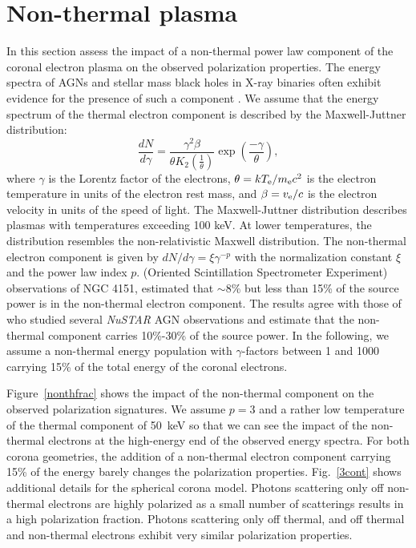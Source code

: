 \documentclass[manuscript]{aastex}
\begin{document}
\section{Non-thermal plasma}\label{nonth}
In this section assess the impact of a non-thermal power law component of the coronal electron plasma
on the observed polarization properties.  The energy spectra of AGNs and stellar mass black holes in X-ray binaries
often exhibit evidence for the presence of such a component \citep[see][and references therein]{ino14, joh97, cop03, mal09}. 
We assume that the energy spectrum of the thermal electron component is described by the Maxwell-Juttner distribution:
\begin{equation}
\frac{dN}{d\gamma}=\frac{\gamma^2\beta}{\theta K_2(\frac{1}{\theta})} \exp(\frac{-\gamma}{\theta}),
\end{equation}
where $\gamma$ is the Lorentz factor of the electrons, $\theta=k T_{\rm e} / m_{\rm e} c^2$ is the electron temperature
in units of the electron rest mass, and $\beta=v_{\rm e}/c$ is the electron velocity in units of the speed of light. 
The Maxwell-Juttner distribution describes plasmas with temperatures exceeding 100 keV. 
At lower temperatures, the distribution resembles the non-relativistic Maxwell distribution. 
The non-thermal electron component is given by $dN/d\gamma=\xi\gamma^{-p}$ 
with the normalization constant $\xi$  and the power law index $p$. 
(Oriented Scintillation Spectrometer Experiment) observations of NGC 4151, \citet{joh97} 
estimated that $\sim$8\% but less than 15\% of the source power is in the non-thermal electron component.
The results agree with those of \citet{fab17} who studied several {\it NuSTAR} AGN observations and 
estimate that the non-thermal component carries 10\%-30\% of the source power. 
In the following, we assume a non-thermal energy population with $\gamma$-factors between 1 and 1000 
carrying 15\% of the total energy of the coronal electrons.

Figure~\ref{nonthfrac} shows the impact of the non-thermal component on the observed polarization signatures.
We assume $p=3$ and a rather low temperature of the thermal component of 50~keV so that we can see 
the impact of the non-thermal electrons at the high-energy end of the observed energy spectra.
For both corona geometries, the addition of a non-thermal electron component carrying 15\% of the energy
barely changes the polarization properties. 
Fig.~\ref{3cont} shows additional details for the spherical corona model. Photons scattering only off non-thermal 
electrons are highly polarized as a small number of scatterings results in a high polarization fraction. 
Photons scattering only off thermal, and off thermal and non-thermal electrons exhibit very similar 
polarization properties. 
\end{document}
